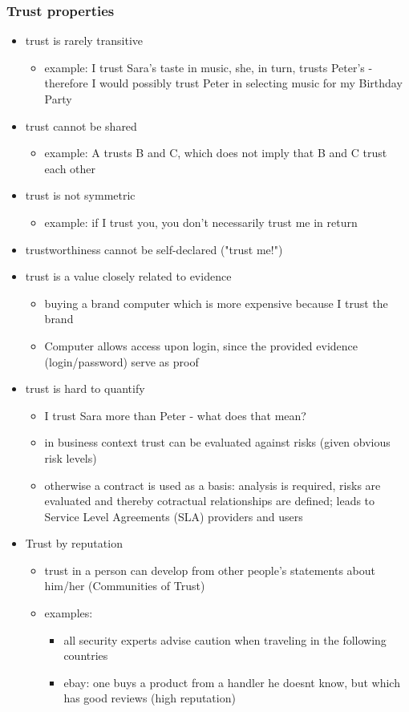 \documentclass[11pt]{article}
\begin{document}
\subsubsection{Trust properties}
\label{sec:orgbedf44f}
\begin{itemize}
\item trust is rarely transitive
\begin{itemize}
\item example: I trust Sara's taste in music, she, in turn, trusts Peter's - therefore I would possibly trust Peter in selecting music for my Birthday Party
\end{itemize}
\item trust cannot be shared
\begin{itemize}
\item example: A trusts B and C, which does not imply that B and C trust each other
\end{itemize}
\item trust is not symmetric
\begin{itemize}
\item example: if I trust you, you don't necessarily trust me in return
\end{itemize}
\item trustworthiness cannot be self-declared ("trust me!")
\item trust is a value closely related to evidence
\begin{itemize}
\item buying a brand computer which is more expensive because I trust the brand
\item Computer allows access upon login, since the provided evidence (login/password) serve as proof
\end{itemize}
\item trust is hard to quantify
\begin{itemize}
\item I trust Sara more than Peter - what does that mean?
\item in business context trust can be evaluated against risks (given obvious risk levels)
\item otherwise a contract is used as a basis: analysis is required, risks are evaluated and thereby cotractual relationships are defined; leads to Service Level Agreements (SLA) providers and users
\end{itemize}
\item Trust by reputation
\begin{itemize}
\item trust in a person can develop from other people's statements about him/her (Communities of Trust)
\item examples:
\begin{itemize}
\item all security experts advise caution when traveling in the following countries
\item ebay: one buys a product from a handler he doesnt know, but which has good reviews (high reputation)
\end{itemize}
\end{itemize}
\end{itemize}
\end{document}
